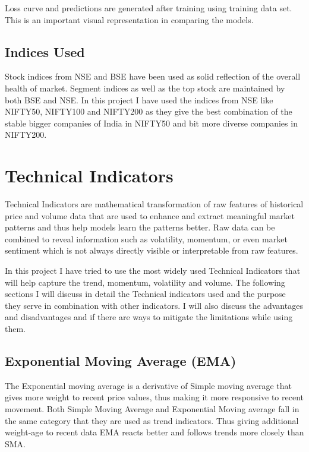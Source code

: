 Loss curve and predictions are generated after training using training data set. This is an important visual representation in comparing the models.

\subsection{Indices Used}

Stock indices from NSE and BSE have been used as solid reflection of the overall health of market. Segment indices as well as the top stock are maintained by both BSE and NSE. In this project I have used the indices from NSE like NIFTY50, NIFTY100 and NIFTY200 as they give the best combination of the stable bigger companies of India in NIFTY50 and bit more diverse companies in NIFTY200.

\section{Technical Indicators}

Technical Indicators are mathematical transformation of raw features of historical price and volume data that are used to enhance and extract meaningful market patterns and thus help models learn the patterns better. Raw data can be combined to reveal information such as volatility, momentum, or even market sentiment which is not always directly visible or interpretable from raw features.

In this project I have tried to use the most widely used Technical Indicators that will help capture the trend, momentum, volatility and volume. The following sections I will discuss in detail the Technical indicators used and the purpose they serve in combination with other indicators. I will also discuss the advantages and disadvantages and if there are ways to mitigate the limitations while using them.

\subsection{Exponential Moving Average (EMA)}

The Exponential moving average is a derivative of Simple moving average that gives more weight to recent price values, thus making it more responsive to recent movement. Both Simple Moving Average and Exponential Moving average fall in the same category that they are used as trend indicators. Thus giving additional weight-age to recent data EMA reacts better and follows trends more closely than SMA.

